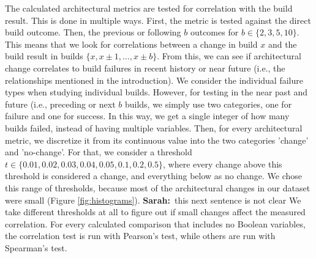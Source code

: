 \documentclass[sigplan, anonymous, review]{acmart}
\newcommand{\sn}[1]{{\color{blue}\textbf{Sarah:}~#1}}
\begin{document}
The calculated architectural metrics are tested for correlation with the build result. This is done in multiple ways. First, the metric is tested against the direct build outcome. Then, the previous or following $b$ outcomes for $b \in \{2, 3, 5, 10\}$. This means that we look for correlations between a change in build $x$ and the build result in builds $\{x, x \pm 1, \hdots, x \pm b\}$. From this, we can see if architectural change correlates to build failures in recent history or near future (i.e., the relationships mentioned in the introduction). 
We consider the individual failure types when studying individual builds. 
However, for testing in the near past and future (i.e., preceding or next $b$ builds, we simply use two categories, one for failure and one for success. In this way, we get a single integer of how many builds failed, instead of having multiple variables. 
Then, for every architectural metric, we discretize it from its continuous value into the two categories 'change' and 'no-change'. For that, we consider a threshold $t \in \{0.01, 0.02, 0.03, 0.04, 0.05, 0.1, 0.2, 0.5\}$, where every change above this threshold is considered a change, and everything below as no change. 
We chose this range of thresholds, because most of the architectural changes in our dataset were small (Figure \ref{fig:histograms}). 
\sn{this next sentence is not clear} We take different thresholds at all to figure out if small changes affect the measured correlation. 
For every calculated comparison that includes no Boolean variables, the correlation test is run with Pearson's test, while others are run with Spearman's test. 
\end{document}
